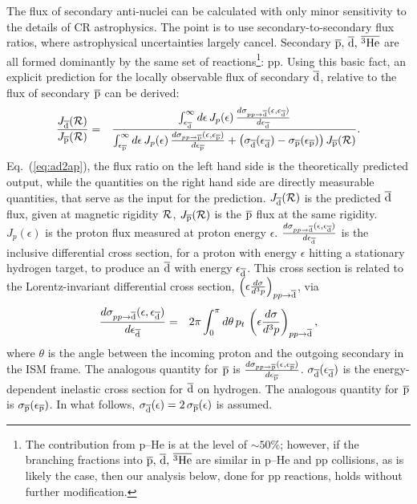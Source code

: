 The flux of secondary anti-nuclei can be calculated with only minor sensitivity to the details of CR astrophysics. The point is to use secondary-to-secondary flux ratios, where astrophysical uncertainties largely cancel. 
%
Secondary $\overline{\rm p},\,\overline{\rm d},\,\overline{\rm ^3He}$ are all formed dominantly by the same set of reactions\footnote{The contribution from p--He is at the level of $\sim50\%$; however, if the branching fractions into $\overline{\rm p},\,\overline{\rm d},\,\overline{\rm ^3He}$ are similar in p--He and pp collisions, as is likely the case, then our analysis below, done for pp reactions, holds without further modification.}: pp. 
%
Using this basic fact, an explicit prediction for the locally observable flux of secondary $\overline{\rm d}$, relative to the  flux of secondary $\overline{\rm p}$ can be derived:
%
 \begin{eqnarray}\label{eq:ad2ap}\frac{J_{\overline{\rm d}}(\mathcal{R})}{J_{\overline{\rm p}}(\mathcal{R})}&=&\frac{\int_{\epsilon_{\overline{\rm d}}}^\infty d\epsilon\,J_p(\epsilon)\,\frac{d\sigma_{pp\to\overline{\rm d}}(\epsilon,\epsilon_{\overline{\rm d}})}{d\epsilon_{\overline{\rm d}}}}{\int_{\epsilon_{\overline{\rm p}}}^\infty d\epsilon\,J_p(\epsilon)\,\frac{d\sigma_{pp\to\overline{\rm p}}(\epsilon,\epsilon_{\overline{\rm p}})}{d\epsilon_{\overline{\rm p}}}+\left(\sigma_{\overline{\rm d}}(\epsilon_{\overline{\rm d}})-\sigma_{\overline{\rm p}}(\epsilon_{\overline{\rm p}})\right)J_{\overline{\rm p}}(\mathcal{R})}.\end{eqnarray}
%
%
\noindent Eq.~(\ref{eq:ad2ap}), the flux ratio on the left hand side is the theoretically predicted output, while the quantities on the right hand side are directly measurable quantities, that serve as the input for the prediction. 
$J_{\overline{\rm d}}(\mathcal{R})$ is the predicted $\overline{\rm d}$ flux, given at magnetic rigidity $\mathcal{R}$, $J_{\overline{\rm p}}(\mathcal{R})$ is the $\overline{\rm p}$ flux at the same rigidity. 
%
$J_p(\epsilon)$ is the proton flux measured at proton energy $\epsilon$. 
%
$\frac{d\sigma_{pp\to\overline{\rm d}}(\epsilon,\epsilon_{\overline{\rm d}})}{d\epsilon_{\overline{\rm d}}}$ is the inclusive differential cross section, for a proton with energy $\epsilon$ hitting a stationary hydrogen target, to produce an $\overline{\rm d}$ with energy $\epsilon_{\overline{\rm d}}$. 
This cross section is related to the Lorentz-invariant differential cross section, $\left(\epsilon\frac{d\sigma}{d^3p}\right)_{pp\to\overline{\rm d}}$, via
%
 \begin{eqnarray}\label{eq:LICS}\frac{d\sigma_{pp\to\overline{\rm d}}(\epsilon,\epsilon_{\overline{\rm d}})}{d\epsilon_{\overline{\rm d}}}&=&2\pi \int_0^\pi d\theta\,p_t\, \left(\epsilon\frac{d\sigma}{d^3p}\right)_{pp\to\overline{\rm d}},\end{eqnarray}
%
where $\theta$ is the angle between the incoming proton and the outgoing secondary in the ISM frame.
The analogous quantity for $\overline{\rm p}$ is $\frac{d\sigma_{pp\to\overline{\rm p}}(\epsilon,\epsilon_{\overline{\rm p}})}{d\epsilon_{\overline{\rm p}}}$.
%
$\sigma_{\overline{\rm d}}(\epsilon_{\overline{\rm d}})$ is the energy-dependent inelastic cross section for $\overline{\rm d}$ on hydrogen. The analogous quantity for $\overline{\rm p}$ is $\sigma_{\overline{\rm p}}(\epsilon_{\overline{\rm p}})$. In what follows, $\sigma_{\overline{\rm d}}(\epsilon)=2\,\sigma_{\overline{\rm p}}(\epsilon)$ is assumed.
